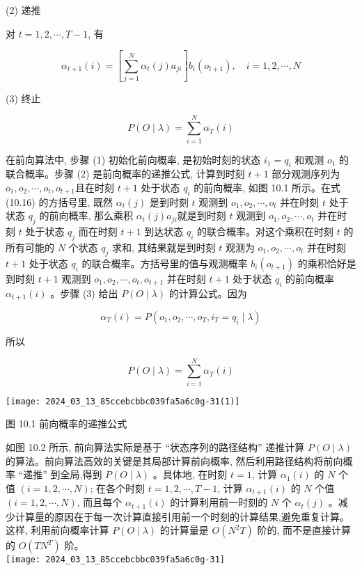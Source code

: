 \documentclass[10pt]{article}
\begin{document}
(2) 递推

对 $t=1,2, \cdots, T-1$, 有


\begin{equation*}
\alpha_{t+1}(i)=\left[\sum_{j=1}^{N} \alpha_{t}(j) a_{j i}\right] b_{i}\left(o_{t+1}\right), \quad i=1,2, \cdots, N \tag{10.16}
\end{equation*}


(3) 终止


\begin{equation*}
P(O \mid \lambda)=\sum_{i=1}^{N} \alpha_{T}(i) \tag{10.17}
\end{equation*}


在前向算法中, 步骤 (1) 初始化前向概率, 是初始时刻的状态 $i_{1}=q_{i}$ 和观测 $o_{1}$ 的联合概率。步骤 (2) 是前向概率的递推公式, 计算到时刻 $t+1$ 部分观测序列为 $o_{1}, o_{2}, \cdots, o_{t}, o_{t+1}$且在时刻 $t+1$ 处于状态 $q_{i}$ 的前向概率, 如图 10.1 所示。在式 (10.16) 的方括号里, 既然 $\alpha_{t}(j)$ 是到时刻 $t$ 观测到 $o_{1}, o_{2}, \cdots, o_{t}$ 并在时刻 $t$ 处于状态 $q_{j}$ 的前向概率, 那么乘积 $\alpha_{t}(j) a_{j i}$就是到时刻 $t$ 观测到 $o_{1}, o_{2}, \cdots, o_{t}$ 并在时刻 $t$ 处于状态 $q_{j}$ 而在时刻 $t+1$ 到达状态 $q_{i}$ 的联合概率。对这个乘积在时刻 $t$ 的所有可能的 $N$ 个状态 $q_{j}$ 求和, 其结果就是到时刻 $t$ 观测为 $o_{1}, o_{2}, \cdots, o_{t}$ 并在时刻 $t+1$ 处于状态 $q_{i}$ 的联合概率。方括号里的值与观测概率 $b_{i}\left(o_{t+1}\right)$ 的乘积恰好是到时刻 $t+1$ 观测到 $o_{1}, o_{2}, \cdots, o_{t}, o_{t+1}$ 并在时刻 $t+1$ 处于状态 $q_{i}$ 的前向概率 $\alpha_{t+1}(i)$ 。步骤 (3) 给出 $P(O \mid \lambda)$ 的计算公式。因为

$$
\alpha_{T}(i)=P\left(o_{1}, o_{2}, \cdots, o_{T}, i_{T}=q_{i} \mid \lambda\right)
$$

所以

$$
P(O \mid \lambda)=\sum_{i=1}^{N} \alpha_{T}(i)
$$

\begin{center}
\texttt{[image: 2024\_03\_13\_85ccebcbbc039fa5a6c0g-31(1)]}
\end{center}

图 10.1 前向概率的递推公式

如图 10.2 所示, 前向算法实际是基于 “状态序列的路径结构” 递推计算 $P(O \mid \lambda)$ 的算法。前向算法高效的关键是其局部计算前向概率, 然后利用路径结构将前向概率 “递推” 到全局,得到 $P(O \mid \lambda)$ 。具体地, 在时刻 $t=1$, 计算 $\alpha_{1}(i)$ 的 $N$ 个值 $(i=1,2, \cdots, N)$; 在各个时刻 $t=1,2, \cdots, T-1$, 计算 $\alpha_{t+1}(i)$ 的 $N$ 个值 $(i=1,2, \cdots, N)$, 而且每个 $\alpha_{t+1}(i)$ 的计算利用前一时刻的 $N$ 个 $\alpha_{t}(j)$ 。减少计算量的原因在于每一次计算直接引用前一个时刻的计算结果,避免重复计算。这样, 利用前向概率计算 $P(O \mid \lambda)$ 的计算量是 $O\left(N^{2} T\right)$ 阶的, 而不是直接计算的 $O\left(T N^{T}\right)$ 阶。\\
\texttt{[image: 2024\_03\_13\_85ccebcbbc039fa5a6c0g-31]}
\end{document}
